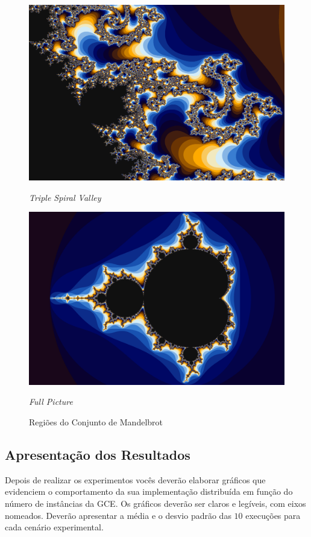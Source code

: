 \documentclass[final,12pt,a4paper]{elsarticle}
\begin{document}
\begin{figure}[]
    \begin{minipage}{.48\textwidth}
    \centering
        \includegraphics[width=.85\textwidth]{triple_spiral}
    \caption{\textit{Triple Spiral Valley}}
    \label{fig:regions}
    \end{minipage}%
    \begin{minipage}{.48\textwidth}
    \centering
        \includegraphics[width=.85\textwidth]{full}
    \caption{\textit{Full Picture}}
    \label{fig:regions}
    \end{minipage}

    \captionsetup{width=\linewidth}
    \caption{Regiões do Conjunto de Mandelbrot}
    \label{fig:regions}
\end{figure}

\subsection{Apresentação dos Resultados}

Depois de realizar os experimentos vocês deverão elaborar gráficos que
evidenciem o comportamento da sua implementação distribuída em função do número
de instâncias da GCE. Os gráficos deverão ser claros e legíveis, com eixos
nomeados. Deverão apresentar a média e o desvio padrão das $10$ execuções para
cada cenário experimental.
\end{document}
